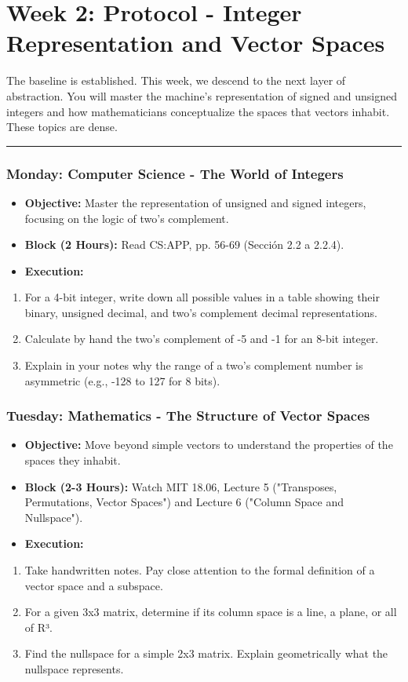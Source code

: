 \section{Week 2: Protocol - Integer Representation and Vector Spaces}

The baseline is established. This week, we descend to the next layer of abstraction. You will master the machine's representation of signed and unsigned integers and how mathematicians conceptualize the spaces that vectors inhabit. These topics are dense.
\noindent\rule{\textwidth}{0.4pt}

\subsubsection{\textbf{Monday: Computer Science - The World of Integers}}
\begin{itemize}
  \item \textbf{Objective:} Master the representation of unsigned and signed integers, focusing on the logic of two's complement.
  \item \textbf{Block (2 Hours):} Read CS:APP, pp. 56-69 (Sección 2.2 a 2.2.4).
  \item \textbf{Execution:}
\end{itemize}
\begin{enumerate}
  \item For a 4-bit integer, write down all possible values in a table showing their binary, unsigned decimal, and two's complement decimal representations.
  \item Calculate by hand the two's complement of -5 and -1 for an 8-bit integer.
  \item Explain in your notes why the range of a two's complement number is asymmetric (e.g., -128 to 127 for 8 bits).

\end{enumerate}
\subsubsection{\textbf{Tuesday: Mathematics - The Structure of Vector Spaces}}
\begin{itemize}
  \item \textbf{Objective:} Move beyond simple vectors to understand the properties of the spaces they inhabit.
  \item \textbf{Block (2-3 Hours):} Watch MIT 18.06, Lecture 5 ("Transposes, Permutations, Vector Spaces") and Lecture 6 ("Column Space and Nullspace").
  \item \textbf{Execution:}
\end{itemize}
\begin{enumerate}
  \item Take handwritten notes. Pay close attention to the formal definition of a vector space and a subspace.
  \item For a given 3x3 matrix, determine if its column space is a line, a plane, or all of R³.
  \item Find the nullspace for a simple 2x3 matrix. Explain geometrically what the nullspace represents.

\end{enumerate}
